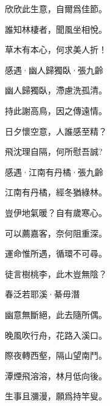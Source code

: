 \documentclass[12pt,a4paper]{ctexbook}
\begin{document}
欣欣此生意，自爾爲佳節。\par
誰知林棲者，聞風坐相悅。\par
草木有本心，何求美人折！\par
感遇·幽人歸獨臥·張九齡\par
幽人歸獨臥，滯慮洗孤清。\par
持此謝高鳥，因之傳遠情。\par
日夕懷空意，人誰感至精？\par
飛沈理自隔，何所慰吾誠?\par
感遇·江南有丹橘·張九齡\par
江南有丹橘，經冬猶綠林。\par
豈伊地氣暖？自有歲寒心。\par
可以薦嘉客，奈何阻重深。\par
運命惟所遇，循環不可尋。\par
徒言樹桃李，此木豈無陰？\par
春泛若耶溪·綦毋潛\par
幽意無斷絕，此去隨所偶。\par
晚風吹行舟，花路入溪口。\par
際夜轉西壑，隔山望南鬥。\par
潭煙飛溶溶，林月低向後。\par
生事且瀰漫，願爲持竿叟。\par
\end{document}
